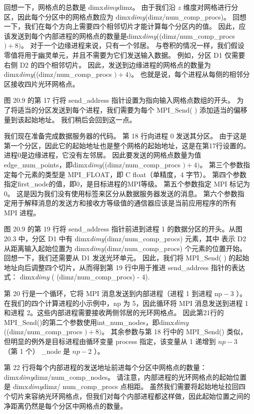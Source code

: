 回想一下，网格点的总数是 dimx\textit{dimy}dimz。 由于我们沿 $z$ 维度对网格进行分区，因此每个分区中的网格点数应为 dimx\textit{dimy}(dimz/num\_comp\_procs)。 回想一下，我们在每个方向上需要四个相邻切片才能计算每个分区内的值。 因此，应该发送到每个内部进程的网格点的数量是dimx\textit{dimy}((dimz/num\_comp\_procs $)+8)$。 对于一个边缘进程来说，只有一个邻居。 与卷积的情况一样，我们假设零值将用于幽灵单元，并且不需要为它们发送输入数据。 例如，分区 D1 仅需要右侧 D2 的四个相邻切片。 因此，发送到边缘进程的网格点的数量为dimx\textit{dimy}((dimz/num\_comp\_procs $)+4)$。 也就是说，每个进程从每侧的相邻分区接收四片光环网格点。

图 20.9 的第 17 行将 send\_address 指针设置为指向输入网格点数组的开头。 为了将适当的分区发送到每个进程，我们需要为每个 MPI\_Send( ) 添加适当的偏移量到该起始地址。 我们稍后会回到这一点。

我们现在准备完成数据服务器的代码。 第 18 行向进程 0 发送其分区。 由于这是第一个分区，因此它的起始地址也是整个网格的起始地址，这是在第17行设置的。进程0是边缘进程，它没有左邻居。 因此要发送的网格点数量为值edge\_num\_points，即dimx\textit{dimy}((dimz/num\_comp\_procs $)+4)$。 第三个参数指定每个元素的类型是 MPI\_FLOAT，即 C float（单精度，4 字节）。 第四个参数指定first\_node的值，即0，是目标进程的MPI等级。 第五个参数指定 MPI 标记为 0。 这是因为我们没有使用标签来区分从数据服务器发送的消息。 第六个参数指定用于解释消息的发送方和接收方等级值的通信器应该是当前应用程序的所有 MPI 进程。

图 20.9 的第 19 行将 send\_address 指针前进到进程 1 的数据分区的开头。从图 20.3 中，分区 D1 中有 dimx\textit{dimy}(dimz/num\_comp\_procs) 元素，其中 表示 D2 从距离输入起始位置为 dimx\textit{dimy}(dimz/num\_comp\_procs) 个元素的位置开始。 回想一下，我们还需要从 D1 发送光环单元。 因此，我们将 MPI\_Send( ) 的起始地址向后调整四个切片，从而得到第 19 行中用于推进 send\_address 指针的表达式： dimx\textit{dimy} ( (dimz/num\_comp\_procs) - 4).

第 20 行是一个循环，它将 MPI 消息发送到内部进程（进程 1 到进程 $\mathrm{np}-3$ ）。 在我们的四个计算进程的小示例中，np 为 5，因此循环将 MPI 消息发送到进程 1 和进程 2。这些内部进程需要接收两侧邻居的光环网格点。 因此第21行的MPI\_Send()的第二个参数使用int\_num\_nodes，即dimx\textit{dimy} ((dimz/num\_comp\_procs $)+8)$。 其余参数与第 18 行中的 MPI\_Send() 类似，但明显的例外是目标进程由循环变量 process 指定，该变量从 1 递增到 $n p-3$（第 1 个） \_node 是 $n p-2$ ）。

第 22 行将每个内部进程的发送地址前进每个分区中网格点的数量：dimx\textit{dimy}dimz/num\_comp\_nodes。 请注意，内部进程的光环网格点的起始位置是 dimx\textit{dimy}dimz/ num\_comp\_procs 点相距。 虽然我们需要将起始地址拉回四个切片来容纳光环网格点，但我们对每个内部进程都这样做，因此起始位置之间的净距离仍然是每个分区中网格点的数量。

